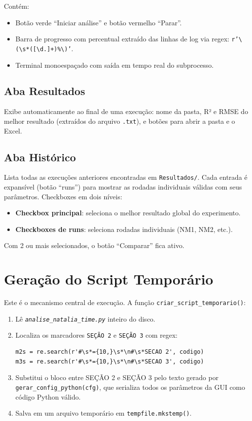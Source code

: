 \documentclass[12pt,a4paper]{report}
\newcommand{\code}[1]{\texttt{#1}}
\newcommand{\arquivo}[1]{\texttt{\itshape #1}}
\begin{document}
Contém:
\begin{itemize}
  \item Botão verde ``Iniciar análise'' e botão vermelho ``Parar''.
  \item Barra de progresso com percentual extraído das linhas de log via
    regex: \code{r'\textbackslash(\textbackslash s*([\textbackslash d.]+)\%\textbackslash)'}.
  \item Terminal monoespaçado com saída em tempo real do subprocesso.
\end{itemize}

\subsection{Aba Resultados}

Exibe automaticamente ao final de uma execução: nome da pasta, R² e RMSE
do melhor resultado (extraídos do arquivo \texttt{.txt}), e botões para
abrir a pasta e o Excel.

\subsection{Aba Histórico}

Lista todas as execuções anteriores encontradas em \texttt{Resultados/}.
Cada entrada é expansível (botão ``runs'') para mostrar as rodadas individuais
válidas com seus parâmetros. Checkboxes em dois níveis:

\begin{itemize}
  \item \textbf{Checkbox principal}: seleciona o melhor resultado global do experimento.
  \item \textbf{Checkboxes de runs}: seleciona rodadas individuais (NM1, NM2, etc.).
\end{itemize}

Com 2 ou mais selecionados, o botão ``Comparar'' fica ativo.

\section{Geração do Script Temporário}

Este é o mecanismo central de execução. A função \code{criar\_script\_temporario()}:

\begin{enumerate}
  \item Lê \arquivo{analise\_natalia\_time.py} inteiro do disco.
  \item Localiza os marcadores \texttt{SEÇÃO 2} e \texttt{SEÇÃO 3} com regex:
    \begin{lstlisting}[caption={Localização dos marcadores de seção}]
m2s = re.search(r'#\s*={10,}\s*\n#\s*SECAO 2', codigo)
m3s = re.search(r'#\s*={10,}\s*\n#\s*SECAO 3', codigo)
    \end{lstlisting}
  \item Substitui o bloco entre SEÇÃO 2 e SEÇÃO 3 pelo texto gerado por
    \code{gerar\_config\_python(cfg)}, que serializa todos os parâmetros
    da GUI como código Python válido.
  \item Salva em um arquivo temporário em \texttt{tempfile.mkstemp()}.
\end{enumerate}
\end{document}
